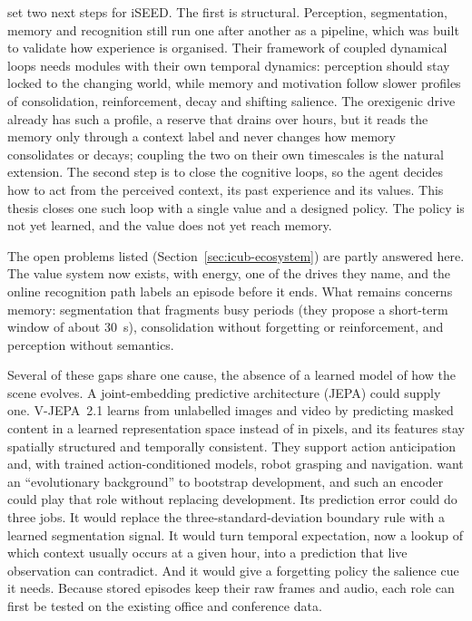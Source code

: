 \citet{Pasquali2026ISEED} set two next steps for iSEED. The first is structural. Perception, segmentation, memory and recognition still run one after another as a pipeline, which was built to validate how experience is organised. Their framework of coupled dynamical loops needs modules with their own temporal dynamics: perception should stay locked to the changing world, while memory and motivation follow slower profiles of consolidation, reinforcement, decay and shifting salience. The orexigenic drive already has such a profile, a reserve that drains over hours, but it reads the memory only through a context label and never changes how memory consolidates or decays; coupling the two on their own timescales is the natural extension. The second step is to close the cognitive loops, so the agent decides how to act from the perceived context, its past experience and its values. This thesis closes one such loop with a single value and a designed policy. The policy is not yet learned, and the value does not yet reach memory.

The open problems \citet{Pasquali2025AlwaysOn} listed (Section~\ref{sec:icub-ecosystem}) are partly answered here. The value system now exists, with energy, one of the drives they name, and the online recognition path labels an episode before it ends. What remains concerns memory: segmentation that fragments busy periods (they propose a short-term window of about 30~s), consolidation without forgetting or reinforcement, and perception without semantics.

Several of these gaps share one cause, the absence of a learned model of how the scene evolves. A joint-embedding predictive architecture (JEPA) could supply one. V-JEPA~2.1 \citep{MurLabadia2026VJEPA21} learns from unlabelled images and video by predicting masked content in a learned representation space instead of in pixels, and its features stay spatially structured and temporally consistent. They support action anticipation and, with trained action-conditioned models, robot grasping and navigation. \citet{Pasquali2026ISEED} want an ``evolutionary background'' to bootstrap development, and such an encoder could play that role without replacing development. Its prediction error could do three jobs. It would replace the three-standard-deviation boundary rule with a learned segmentation signal. It would turn temporal expectation, now a lookup of which context usually occurs at a given hour, into a prediction that live observation can contradict. And it would give a forgetting policy the salience cue it needs. Because stored episodes keep their raw frames and audio, each role can first be tested on the existing office and conference data.

